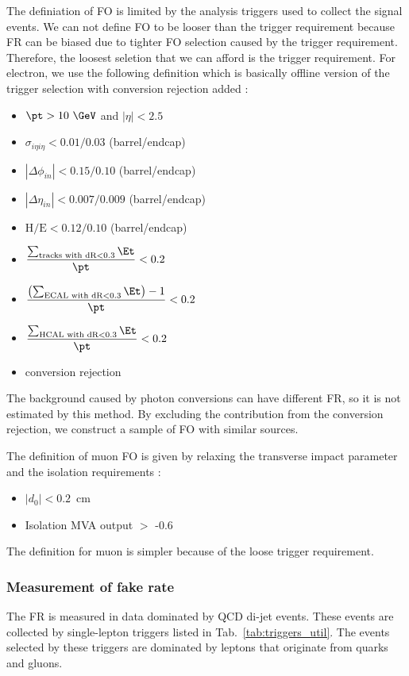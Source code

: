 The definiation of FO is limited by the analysis triggers used to collect the signal events. 
We can not define FO to be looser than the trigger requirement because FR can be 
biased due to tighter FO selection caused by the trigger requirement. Therefore, the 
loosest seletion that we can afford is the trigger requirement. For electron,  
we use the following definition which is basically offline version of the trigger selection
with conversion rejection added : 
\begin{itemize}
  \item $\pt>10~\GeV$ and $|\eta| < 2.5$
  \item $\sigma_{i\eta i\eta} < 0.01/0.03$ (barrel/endcap)
  \item $|\Delta\phi_{in}| < 0.15/0.10$ (barrel/endcap)
  \item $|\Delta\eta_{in}| < 0.007/0.009$ (barrel/endcap)
  \item $\textrm{H/E}< 0.12/0.10$ (barrel/endcap)
  \item $\displaystyle \frac{\sum_{\textrm{tracks with dR}<0.3}\Et}{\pt}<0.2$
  \item $\displaystyle \frac{\left(\sum_{\textrm{ECAL with dR}<0.3}\Et\right)-1}{\pt}<0.2$
  \item $\displaystyle \frac{\sum_{\textrm{HCAL with dR}<0.3}\Et}{\pt}<0.2$
  \item conversion rejection 
\end{itemize}
The background caused by photon conversions 
can have different FR, so it is not estimated by this method. 
By excluding the contribution from the conversion rejection, 
we construct a sample of FO with similar sources. 

The definition of muon FO is given by relaxing the transverse impact parameter and 
the isolation requirements :  
\begin{itemize}
    \item $\left|d_0\right| < 0.2$~cm
    \item Isolation MVA output $>$ -0.6
\end{itemize}
The definition for muon is simpler because of the loose trigger requirement. 

\subsubsection{Measurement of fake rate}

The FR is measured in data dominated by QCD di-jet events. 
These events are collected by single-lepton triggers listed in Tab.~\ref{tab:triggers_util}.
The events selected by these triggers are dominated by leptons that 
originate from quarks and gluons. 

